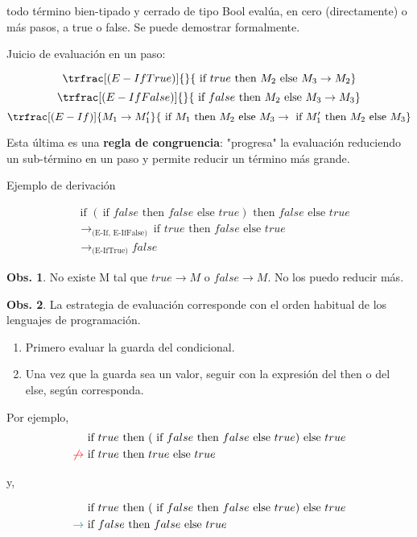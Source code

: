 \documentclass{report}
\theoremstyle{definition} %
\newtheorem{observation}{Obs.}[chapter]
\newcommand{\ifte}[3]{\ \text{if } #1 \text{ then } #2 \text{ else } #3}
\newcommand{\reduces}{\to}
\newcommand{\reducesTo}[1]{\reduces_\text{(#1)}}
\newcommand{\reduce}[2]{#1 \reduces #2}
\newcommand{\deriv}[3]{\trfrac[(#1)]{#2}{#3}}
\begin{document}
todo término bien-tipado y cerrado de tipo Bool evalúa, en cero
(directamente) o más pasos, a true o false. Se puede demostrar formalmente.

Juicio de evaluación en un paso:

\[
    \deriv{E-IfTrue}
        {}
        {
            \reduce
                {\ifte{true}{M_2}{M_3}}
                {M_2}
        }
\]
\vspace{0.5cm}
\[
    \deriv{E-IfFalse}
        {}
        {
            \reduce
                {\ifte{false}{M_2}{M_3}}
                {M_3}
        }
\]
\vspace{0.5cm}
\[
    \deriv{E-If}
        {\reduce{M_1}{M_1'}}
        {
            \reduce
                {\ifte{M_1}{M_2}{M_3}}
                {\ifte{M_1'}{M_2}{M_3}}
        }
\]

Esta última es una \textbf{regla de congruencia}: "progresa" la evaluación
reduciendo un sub-término en un paso y permite reducir un término más grande.

Ejemplo de derivación

\begin{align*}
    &\ifte
        {(\ifte{false}{false}{true})}
        {false}
        {true}\\
    &\reducesTo{E-If, E-IfFalse}
        \ifte{true}{false}{true}\\
    &\reducesTo{E-IfTrue} false
\end{align*}

\begin{observation}
    No existe M tal que $\reduce{true}{M}$ o $\reduce{false}{M}$. No los puedo reducir más.
\end{observation}

\begin{observation}
    La estrategia de evaluación corresponde con el orden habitual de los
    lenguajes de programación.

    \begin{enumerate}
        \item Primero evaluar la guarda del condicional.
        \item Una vez que la guarda sea un valor, seguir con la expresión del
        then o del else, según corresponda.
    \end{enumerate}

    Por ejemplo,
    \begin{align*}
        &\ifte
            {true}
            {(\ifte{false}{false}{true})}
            {true}\\
        \textcolor{red}{\not\to} &\ifte{true}{true}{true}
    \end{align*}

    y,

    \begin{align*}
        &\ifte
            {true}
            {(\ifte{false}{false}{true})}
            {true}\\
        \textcolor{teal}{\to} &\ifte{false}{false}{true}
    \end{align*}
\end{observation}
\end{document}
